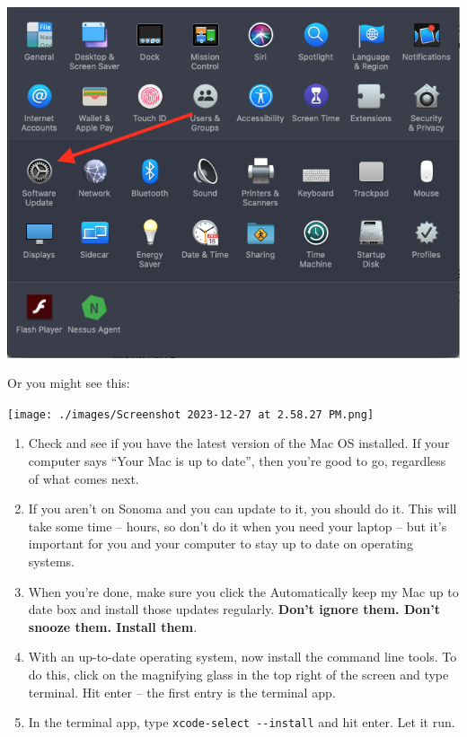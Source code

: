 \documentclass[
  letterpaper,
  DIV=11,
  numbers=noendperiod]{scrreprt}
\begin{document}
\includegraphics{./images/Screen Shot 2020-07-30 at 5.35.08 PM.png}

Or you might see this:

\texttt{[image: ./images/Screenshot 2023-12-27 at 2.58.27 PM.png]}

\begin{enumerate}
\def\labelenumi{\arabic{enumi}.}
\setcounter{enumi}{1}
\item
  Check and see if you have the latest version of the Mac OS installed.
  If your computer says ``Your Mac is up to date'', then you're good to
  go, regardless of what comes next.
\item
  If you aren't on Sonoma and you can update to it, you should do it.
  This will take some time -- hours, so don't do it when you need your
  laptop -- but it's important for you and your computer to stay up to
  date on operating systems.
\item
  When you're done, make sure you click the Automatically keep my Mac up
  to date box and install those updates regularly. \textbf{Don't ignore
  them. Don't snooze them. Install them}.
\item
  With an up-to-date operating system, now install the command line
  tools. To do this, click on the magnifying glass in the top right of
  the screen and type terminal. Hit enter -- the first entry is the
  terminal app.
\item
  In the terminal app, type \texttt{xcode-select\ -\/-install} and hit
  enter. Let it run.
\end{enumerate}
\end{document}
